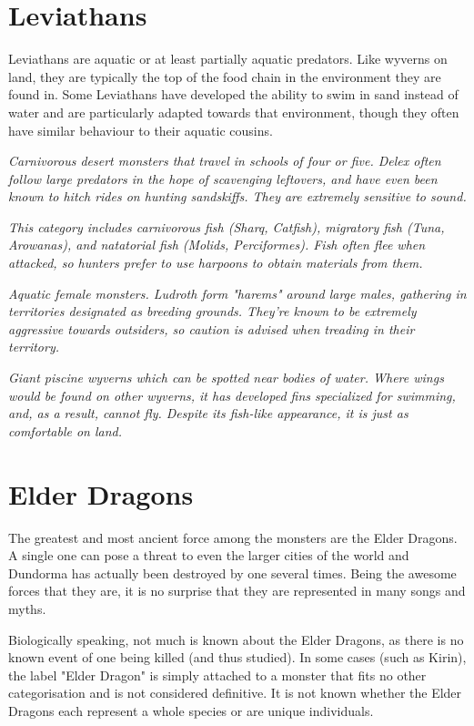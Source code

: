 \section{Leviathans}
Leviathans are aquatic or at least partially aquatic predators. Like wyverns on land, they are typically the top of the food chain in the environment they are found in. Some Leviathans have developed the ability to swim in sand instead of water and are particularly adapted towards that environment, though they often have similar behaviour to their aquatic cousins.

\textit{Carnivorous desert monsters that travel in schools of four or five. Delex often follow large predators in the hope of scavenging leftovers, and have even been known to hitch rides on hunting sandskiffs. They are extremely sensitive to sound.}

\textit{This category includes carnivorous fish (Sharq, Catfish), migratory fish (Tuna, Arowanas), and natatorial fish (Molids, Perciformes). Fish often flee when attacked, so hunters prefer to use harpoons to obtain materials from them.}

\textit{Aquatic female monsters. Ludroth form "harems" around large males, gathering in territories designated as breeding grounds. They're known to be extremely aggressive towards outsiders, so caution is advised when treading in their territory.}

\textit{Giant piscine wyverns which can be spotted near bodies of water. Where wings would be found on other wyverns, it has developed fins specialized for swimming, and, as a result, cannot fly. Despite its fish-like appearance, it is just as comfortable on land.}

\section{Elder Dragons}
The greatest and most ancient force among the monsters are the Elder Dragons. A single one can pose a threat to even the larger cities of the world and Dundorma has actually been destroyed by one several times. Being the awesome forces that they are, it is no surprise that they are represented in many songs and myths.

Biologically speaking, not much is known about the Elder Dragons, as there is no known event of one being killed (and thus studied). In some cases (such as Kirin), the label "Elder Dragon" is simply attached to a monster that fits no other categorisation and is not considered definitive. It is not known whether the Elder Dragons each represent a whole species or are unique individuals.

